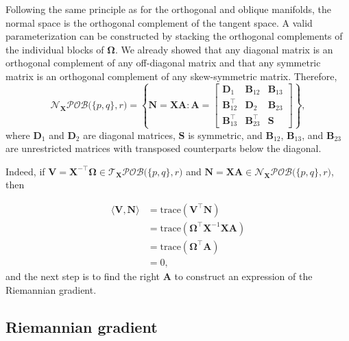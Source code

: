 \documentclass[
  12pt,
  letterpaper,
  article]{scrartcl}
\begin{document}
Following the same principle as for the orthogonal and oblique
manifolds, the normal space is the orthogonal complement of the tangent
space. A valid parameterization can be constructed by stacking the
orthogonal complements of the individual blocks of \(\mathbf{\Omega}\).
We already showed that any diagonal matrix is an orthogonal complement
of any off-diagonal matrix and that any symmetric matrix is an
orthogonal complement of any skew-symmetric matrix. Therefore, \[
\mathcal{N}_{\mathbf{X}}
\mathcal{POB}\big(\{p,q\},r\big)
=
\left\{
\mathbf{N}=\mathbf{X}\mathbf{A}:
\mathbf{A}
=
\begin{bmatrix}
\mathbf{D}_1
&
\mathbf{B}_{12}
&
\mathbf{B}_{13}
\\
\mathbf{B}_{12}^\top
&
\mathbf{D}_2
&
\mathbf{B}_{23}
\\
\mathbf{B}_{13}^\top
&
\mathbf{B}_{23}^\top
&
\mathbf{S}
\end{bmatrix}
\right\},
\] where \(\mathbf{D}_1\) and \(\mathbf{D}_2\) are diagonal matrices,
\(\mathbf{S}\) is symmetric, and \(\mathbf{B}_{12}\),
\(\mathbf{B}_{13}\), and \(\mathbf{B}_{23}\) are unrestricted matrices
with transposed counterparts below the diagonal.

Indeed, if
\(\mathbf{V}=\mathbf{X}^{-\top}\mathbf{\Omega}\in\mathcal{T}_{\mathbf{X}}\mathcal{POB}\big(\{p,q\},r\big)\)
and
\(\mathbf{N}=\mathbf{X}\mathbf{A}\in\mathcal{N}_{\mathbf{X}}\mathcal{POB}\big(\{p,q\},r\big)\),
then

\[
\begin{aligned}
\langle\mathbf{V},\mathbf{N}\rangle
&=
\mathrm{trace}
\left(
\mathbf{V}^\top\mathbf{N}
\right)
\\
&=
\mathrm{trace}
\left(
\mathbf{\Omega}^\top
\mathbf{X}^{-1}
\mathbf{X}
\mathbf{A}
\right)
\\
&=
\mathrm{trace}
\left(
\mathbf{\Omega}^\top\mathbf{A}
\right)
\\
&=
0,
\end{aligned}
\] and the next step is to find the right \(\mathbf{A}\) to construct an
expression of the Riemannian gradient.

\subsection{Riemannian gradient}\label{riemannian-gradient}
\end{document}
